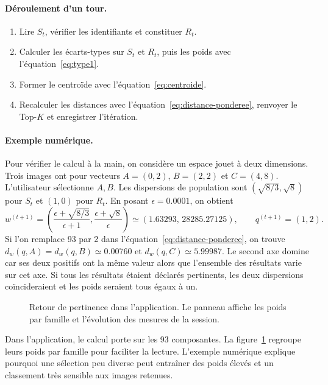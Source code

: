\paragraph{Déroulement d'un tour.}
\begin{enumerate}[leftmargin=*,label=\arabic*.]
  \item Lire \(S_t\), vérifier les identifiants et constituer \(R_t\).
  \item Calculer les écarts-types sur \(S_t\) et \(R_t\), puis les poids avec l'équation~\eqref{eq:type1}.
  \item Former le centroïde avec l'équation~\eqref{eq:centroide}.
  \item Recalculer les distances avec l'équation~\eqref{eq:distance-ponderee}, renvoyer le Top-\(K\) et enregistrer l'itération.
\end{enumerate}

\clearpage
\paragraph{Exemple numérique.}
Pour vérifier le calcul à la main, on considère un espace jouet à deux dimensions. Trois images ont pour vecteurs \(A=(0,2)\), \(B=(2,2)\) et \(C=(4,8)\). L'utilisateur sélectionne \(A,B\). Les dispersions de population sont \((\sqrt{8/3},\sqrt{8})\) pour \(S_t\) et \((1,0)\) pour \(R_t\). En posant \(\epsilon=\num{0.0001}\), on obtient
\begin{equation}
  w^{(t+1)}
  =\left(\frac{\epsilon+\sqrt{8/3}}{\epsilon+1},
         \frac{\epsilon+\sqrt{8}}{\epsilon}\right)
  \simeq (\num{1.63293},\,\num{28285.27125}),
  \qquad q^{(t+1)}=(1,2).
  \label{eq:exemple}
\end{equation}
Si l'on remplace 93 par 2 dans l'équation~\eqref{eq:distance-ponderee}, on trouve \(d_w(q,A)=d_w(q,B)\simeq\num{0.00760}\) et \(d_w(q,C)\simeq\num{5.99987}\). Le second axe domine car ses deux positifs ont la même valeur alors que l'ensemble des résultats varie sur cet axe. Si tous les résultats étaient déclarés pertinents, les deux dispersions coïncideraient et les poids seraient tous égaux à un.

\begin{figure}[ht]
  \centering
  \caption{Retour de pertinence dans l'application. Le panneau affiche les poids par famille et l'évolution des mesures de la session.}
  \label{fig:retour-pertinence}
\end{figure}

Dans l'application, le calcul porte sur les 93 composantes. La figure~\ref{fig:retour-pertinence} regroupe leurs poids par famille pour faciliter la lecture. L'exemple numérique explique pourquoi une sélection peu diverse peut entraîner des poids élevés et un classement très sensible aux images retenues.
